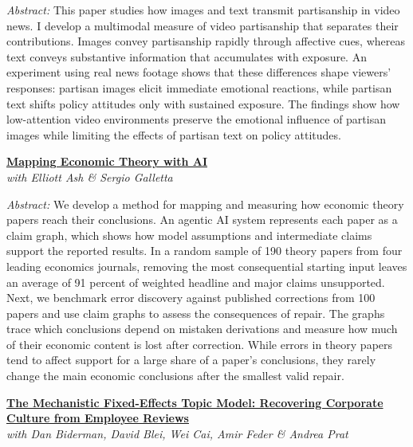 \documentclass[10pt,letterpaper]{article}
\begin{document}
\medskip

\textit{Abstract:} This paper studies how images and text transmit partisanship in video news. I develop a multimodal measure of video partisanship that separates their contributions. Images convey partisanship rapidly through affective cues, whereas text conveys substantive information that accumulates with exposure. An experiment using real news footage shows that these differences shape viewers' responses: partisan images elicit immediate emotional reactions, while partisan text shifts policy attitudes only with sustained exposure. The findings show how low-attention video environments preserve the emotional influence of partisan images while limiting the effects of partisan text on policy attitudes.

\vspace{10pt}

\textbf{\href{https://andreaciccarone.github.io/claim_graphs_draft.pdf}{Mapping Economic Theory with AI}}\\
\textit{with Elliott Ash \& Sergio Galletta}

\medskip

\textit{Abstract:} We develop a method for mapping and measuring how economic theory papers reach their conclusions. An agentic AI system represents each paper as a claim graph, which shows how model assumptions and intermediate claims support the reported results. In a random sample of 190 theory papers from four leading economics journals, removing the most consequential starting input leaves an average of 91 percent of weighted headline and major claims unsupported. Next, we benchmark error discovery against published corrections from 100 papers and use claim graphs to assess the consequences of repair. The graphs trace which conclusions depend on mistaken derivations and measure how much of their economic content is lost after correction. While errors in theory papers tend to affect support for a large share of a paper's conclusions, they rarely change the main economic conclusions after the smallest valid repair.

\vspace{10pt}

\newpage

\textbf{\href{https://andreaciccarone.github.io/FETM_draft.pdf}{The Mechanistic Fixed-Effects Topic Model: Recovering Corporate Culture from Employee Reviews}}\\
\textit{with Dan Biderman, David Blei, Wei Cai, Amir Feder \& Andrea Prat}
\end{document}

